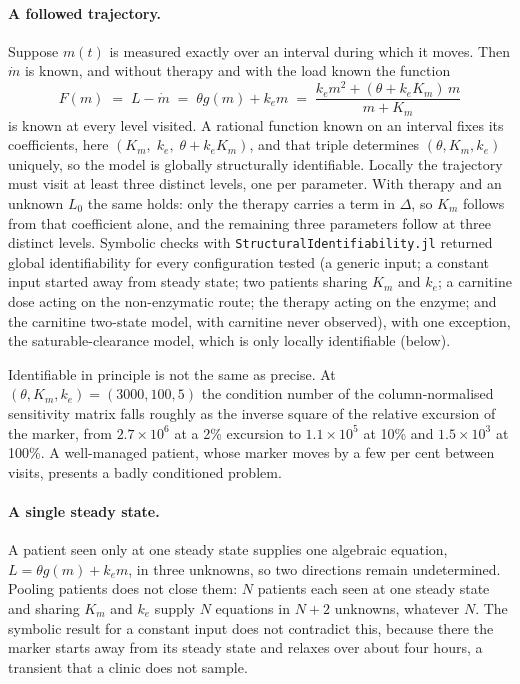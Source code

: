 \paragraph{A followed trajectory.} Suppose $m(t)$ is measured exactly over an interval
during which it moves. Then $\dot m$ is known, and without therapy and with the load known
the function
\begin{equation}
\label{seq:s1-F}
F(m)\;=\;L-\dot m\;=\;\theta g(m)+k_e m\;=\;\frac{k_e m^2+(\theta+k_eK_m)\,m}{m+K_m}
\end{equation}
is known at every level visited. A rational function known on an interval fixes its
coefficients, here $(K_m,\;k_e,\;\theta+k_eK_m)$, and that triple determines
$(\theta,K_m,k_e)$ uniquely, so the model is globally structurally identifiable. Locally the
trajectory must visit at least three distinct levels, one per parameter. With therapy and an
unknown $L_0$ the same holds: only the therapy carries a term in $\Delta$, so $K_m$ follows
from that coefficient alone, and the remaining three parameters follow at three distinct
levels. Symbolic checks with \texttt{StructuralIdentifiability.jl} returned global
identifiability for every configuration tested (a generic input; a constant input started
away from steady state; two patients sharing $K_m$ and $k_e$; a carnitine dose acting on the
non-enzymatic route; the therapy acting on the enzyme; and the carnitine two-state model,
with carnitine never observed), with one exception, the saturable-clearance model, which is
only locally identifiable (below).

Identifiable in principle is not the same as precise. At $(\theta,K_m,k_e)=(3000,100,5)$ the
condition number of the column-normalised sensitivity matrix falls roughly as the inverse
square of the relative excursion of the marker, from $2.7\times10^{6}$ at a 2\% excursion
to $1.1\times10^{5}$ at 10\% and $1.5\times10^{3}$ at 100\%. A well-managed patient, whose
marker moves by a few per cent between visits, presents a badly conditioned problem.

\paragraph{A single steady state.} A patient seen only at one steady state supplies one
algebraic equation, $L=\theta g(m)+k_e m$, in three unknowns, so two directions remain
undetermined. Pooling patients does not close them: $N$ patients each seen at one steady
state and sharing $K_m$ and $k_e$ supply $N$ equations in $N+2$ unknowns, whatever $N$. The
symbolic result for a constant input does not contradict this, because there the marker
starts away from its steady state and relaxes over about four hours, a transient that a
clinic does not sample.

